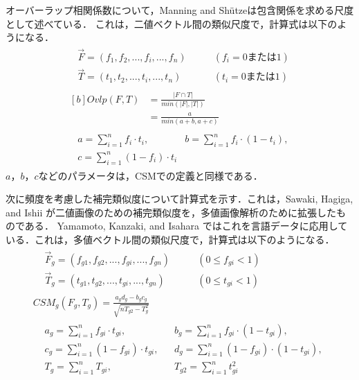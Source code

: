 \documentclass[japanese]{jnlp_1.4}
\begin{document}
オーバーラップ相関係数について，Manning and Sh\"{u}tzeは包含関係を求める尺度として述べている\cite{Book_22}．
これは，二値ベクトル間の類似尺度で，計算式は以下のようになる．
{\allowdisplaybreaks
\begin{gather}
\begin{aligned}
 & \overrightarrow{F}=(f_{1}, f_{2},..., f_{i},... ,f_{n})\qquad & (f_{i}=0 または 1) \\
 & \overrightarrow{T}=(t_{1}, t_{2},..., t_{i},..., t_{n}) & (t_{i}=0 または 1) 
\end{aligned}
\nonumber\\
\begin{aligned}[b]
 \mathit{Ovlp}(F, T) &= \frac{|F \cap T|}{\mathit{min}(|F|, |T|)}  \\
	 &= \frac{a}{\mathit{min}(a + b , a + c)} 
\end{aligned}\\
\begin{aligned}
 & a = \sum_{i=1}^n f_i \cdot t_i, & b = \sum_{i=1}^n f_i \cdot (1 - t_i), \\
 & c = \sum_{i=1}^n (1 - f_i) \cdot t_i & 
\end{aligned}
\nonumber
\end{gather}
}
$a$，$b$，$c$などのパラメータは，CSMでの定義と同様である．

次に頻度を考慮した補完類似度について計算式を示す．これは，Sawaki, Hagiga, and Ishii が二値画像のための補完類似度を，多値画像解析のために拡張したものである\cite{Inproc_31}．
Yamamoto, Kanzaki, and Isahara ではこれを言語データに応用している\cite{Inproc_39}．これは，多値ベクトル間の類似尺度で，計算式は以下のようになる．
\begin{gather}
\begin{aligned}
 & \overrightarrow{F}_g = (f_{g1}, f_{g2},..., f_{gi},... ,f_{gn}) \qquad & (0 \leq f_{gi} < 1) \\
 & \overrightarrow{T}_g = (t_{g1}, t_{g2},..., t_{gi},..., t_{gn}) & (0 \leq t_{gi} < 1) 
\end{aligned}
\nonumber\\
CSM_{g}(F_{g}, T_{g}) = \frac{a_{g}d_{g}-b_{g}c_{g}}{\sqrt{nT_{g2} - T_{g}^{2}}} \\
\begin{aligned}
 & a_{g} = \sum_{i=1}^n f_{gi} \cdot t_{gi}, && b_{g} = \sum_{i=1}^n f_{gi} \cdot (1 - t_{gi}), \\
 & c_{g} = \sum_{i=1}^n (1 - f_{gi}) \cdot t_{gi}, && d_{g} = \sum_{i=1}^n (1 - f_{gi}) \cdot (1 - t_{gi}), \\
 & T_{g} = \sum_{i=1}^n T_{gi}, && T_{g2} = \sum_{i=1}^n t_{gi}^2 \\
\end{aligned} 
\nonumber
\end{gather}
\end{document}
